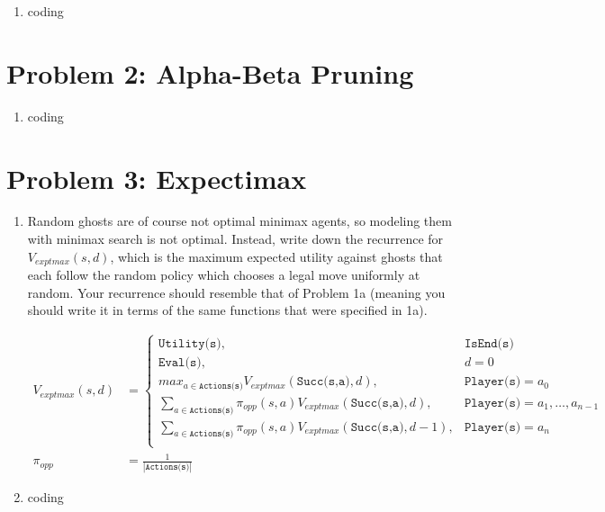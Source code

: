 \documentclass[10pt]{article}
\begin{document}
\begin{enumerate}[label=(\alph*)]
  \item coding

\end{enumerate}

\section*{\normalsize Problem 2: Alpha-Beta Pruning}

\begin{enumerate}[label=(\alph*)]

  \item coding

\end{enumerate}

\section*{\normalsize Problem 3: Expectimax}

\begin{enumerate}[label=(\alph*)]

  \item Random ghosts are of course not optimal minimax agents, so modeling them with minimax search is not optimal. Instead, write down the recurrence for $V_{exptmax}(s,d)$, which is the maximum expected utility against ghosts that each follow the random policy which chooses a legal move uniformly at random. Your recurrence should resemble that of Problem 1a (meaning you should write it in terms of the same functions that were specified in 1a).
  
  \begin{align*}
  V_{exptmax}(s,d) &= \begin{cases}
  \texttt{Utility(s)}, &\texttt{IsEnd(s)}\\
  \texttt{Eval(s)}, &d = 0\\
  max_{a \in \texttt{Actions(s)}}V_{exptmax}(\texttt{Succ(s,a)},d), &\texttt{Player(s)} = a_0\\
  \sum_{a \in \texttt{Actions(s)}}\pi_{opp}(s,a)V_{exptmax}(\texttt{Succ(s,a)},d), &\texttt{Player(s)} = a_1, \dots, a_{n-1}\\
  \sum_{a \in \texttt{Actions(s)}}\pi_{opp}(s,a)V_{exptmax}(\texttt{Succ(s,a)},d-1), &\texttt{Player(s)} = a_n\\
  \end{cases}\\ 
  \pi_{opp} &= \frac{1}{|\texttt{Actions(s)}|}
  \end{align*}
  
  \item coding
		
\end{enumerate}
\iffalse
\end{document}
